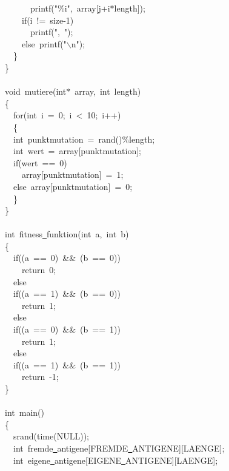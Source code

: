 {\ttfamily \raggedright \small
\ \ \ \ \ \ printf("{}\%i"{},\ array[j+i$\ast$length]);\\
\ \ \ \ if(i\ !=\ size-{}1)\\
\ \ \ \ \ \ printf("{},\ "{});\\
\ \ \ \ else\ printf("{}$\backslash$n"{});\\
\ \ \}\\
\}\\
\ \\
void\ mutiere(int$\ast$\ array,\ int\ length)\\
\{\\
\ \ for(int\ i\ =\ 0;\ i\ <{}\ 10;\ i++)\\
\ \ \{\\
\ \ int\ punktmutation\ =\ rand()\%length;\\
\ \ int\ wert\ =\ array[punktmutation];\\
\ \ if(wert\ ==\ 0)\\
\ \ \ \ array[punktmutation]\ =\ 1;\\
\ \ else\ array[punktmutation]\ =\ 0;\\
\ \ \}\\
\}\\
\ \\
int\ fitness\underline\ funktion(int\ a,\ int\ b)\\
\{\\
\ \ if((a\ ==\ 0)\ \&\&\ (b\ ==\ 0))\\
\ \ \ \ return\ 0;\\
\ \ else\ \\
\ \ if((a\ ==\ 1)\ \&\&\ (b\ ==\ 0))\\
\ \ \ \ return\ 1;\\
\ \ else\\
\ \ if((a\ ==\ 0)\ \&\&\ (b\ ==\ 1))\\
\ \ \ \ return\ 1;\\
\ \ else\\
\ \ if((a\ ==\ 1)\ \&\&\ (b\ ==\ 1))\\
\ \ \ \ return\ -{}1;\\
\}\\
\ \\
int\ main()\\
\{\\
\ \ srand(time(NULL));\\
\ \ int\ fremde\underline\ antigene[FREMDE\underline\ ANTIGENE][LAENGE];\\
\ \ int\ eigene\underline\ antigene[EIGENE\underline\ ANTIGENE][LAENGE];\\
}
